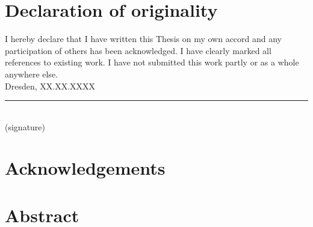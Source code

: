 \documentclass[12 pt, a4paper]{report}
\theoremstyle{definition}
\newcommand{\blankpage}{
\newpage
\thispagestyle{empty}
\addtocounter{page}{-1}
\mbox{}
\newpage
}
\begin{document}
\sloppy

\blankpage

\chapter*{Declaration of originality}
I hereby declare that I have written this Thesis on my own accord and any participation of others has been acknowledged. I have clearly marked all references to existing work. I have not submitted this work partly or as a whole anywhere else. \\

Dresden, XX.XX.XXXX \\
\rule{150 px}{0.5 px} \\
(signature)
\blankpage

\chapter*{Acknowledgements}
\lipsum[1]
\blankpage

%

\chapter*{Abstract}
\lipsum[1]

\tableofcontents
\pagebreak

{}



\pagebreak



\pagebreak




\singlespacing




\printglossaries
\end{document}
